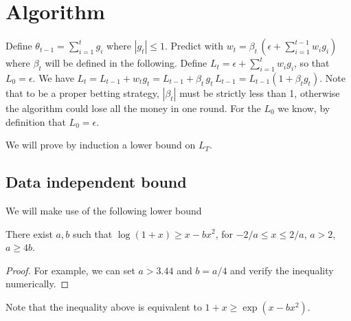 \section{Algorithm}

Define $\theta_{t-1}=\sum_{i=1}^t g_i$ where $|g_t|\leq 1$.
Predict with $w_t=\beta_t \, (\epsilon+\sum_{i=1}^{t-1} w_i g_i)$ where $\beta_t$ will be defined in the following. Define $L_t=\epsilon + \sum_{i=1}^t w_i g_i$, so that $L_0=\epsilon$.
We have $L_t= L_{t-1}+w_t g_t =L_{t-1} + \beta_t \, g_t \, L_{t-1} = L_{t-1} (1+\beta_t g_t)$.
Note that to be a proper betting strategy, $|\beta_t|$ must be strictly less than 1, otherwise the algorithm could lose all the money in one round.
For the $L_0$ we know, by definition that $L_0=\epsilon$.

We will prove by induction a lower bound on $L_T$.


\subsection{Data independent bound}

We will make use of the following lower bound
\begin{lemma}
There exist $a,b$ such that 
$\log(1+x) \geq x - b x^2$, for $-2/a \leq x \leq 2/a$, $a>2$, $a\geq4 b$.
\end{lemma}
\begin{proof}
For example, we can set $a>3.44$ and $b=a/4$ and verify the inequality numerically.
\end{proof}
Note that the inequality above is equivalent to $1+x \geq \exp(x - b x^2)$.

